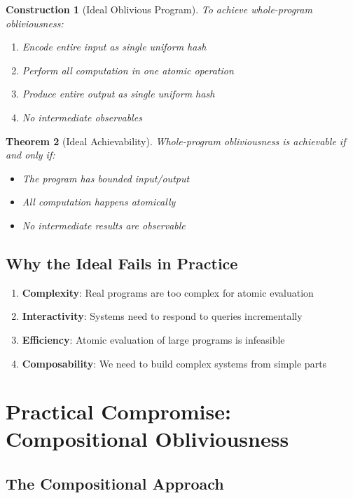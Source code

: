 \documentclass[11pt,final,hidelinks]{article}
\newtheorem{theorem}{Theorem}[section]
\newtheorem{construction}[theorem]{Construction}
\begin{document}
\begin{construction}[Ideal Oblivious Program]
To achieve whole-program obliviousness:
\begin{enumerate}
    \item Encode entire input as single uniform hash
    \item Perform all computation in one atomic operation
    \item Produce entire output as single uniform hash
    \item No intermediate observables
\end{enumerate}
\end{construction}

\begin{theorem}[Ideal Achievability]
Whole-program obliviousness is achievable if and only if:
\begin{itemize}
    \item The program has bounded input/output
    \item All computation happens atomically
    \item No intermediate results are observable
\end{itemize}
\end{theorem}

\subsection{Why the Ideal Fails in Practice}

\begin{enumerate}
    \item \textbf{Complexity}: Real programs are too complex for atomic evaluation
    \item \textbf{Interactivity}: Systems need to respond to queries incrementally
    \item \textbf{Efficiency}: Atomic evaluation of large programs is infeasible
    \item \textbf{Composability}: We need to build complex systems from simple parts
\end{enumerate}

\section{Practical Compromise: Compositional Obliviousness}

\subsection{The Compositional Approach}
\end{document}
